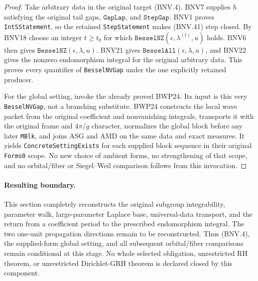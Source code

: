 \begin{proof}
Take arbitrary data in the original target (BNV.4).  BNV7 supplies
$h$ satisfying the original tail gaps, $\texttt{GapLap}$, and
$\texttt{StepGap}$.  BNV1 proves \texttt{IntSStatement}, so the retained
\texttt{StepStatement} makes (BNV.41) step closed.  By BNV18 choose
an integer $t\ge t_0$ for which
$\texttt{BesselNZ}(\epsilon,\lambda^{(t)},u)$ holds.
BNV6 then gives $\texttt{BesselNZ}(\epsilon,\lambda,u)$.
BNV21 gives $\texttt{BesselAll}(\epsilon,\lambda,u)$, and BNV22 gives
the nonzero endomorphism integral for the original arbitrary data.
This proves every quantifier of \texttt{BesselNVGap} under the one
explicitly retained producer.

For the global setting, invoke the already proved BWP24.  Its input is
this very \texttt{BesselNVGap}, not a branching substitute.  BWP24
constructs the local wave packet from the original coefficient and
nonvanishing integrals, transports it with the original frame and
$4\pi/g$ character, normalizes the global block before any later
\texttt{MBlk}, and joins ASG and AMD on the same data and exact measures.
It yields \texttt{ConcreteSettingExists} for each supplied block sequence
in their original \texttt{Forms0} scope.  No new choice of ambient forms,
no strengthening of that scope, and no orbital/fiber or Siegel--Weil
comparison follows from this invocation.
\end{proof}

\paragraph{Resulting boundary.}
This section completely reconstructs the original subgroup integrability,
parameter walk, large-parameter Laplace base, universal-data transport,
and the return from a coefficient period to the prescribed endomorphism
integral.  The two one-unit propagation directions remain to be
reconstructed.  Thus (BNV.4), the supplied-form global setting, and all
subsequent orbital/fiber comparisons remain conditional at this stage.
No whole selected obligation, unrestricted RH theorem, or unrestricted
Dirichlet-GRH theorem is declared closed by this component.
